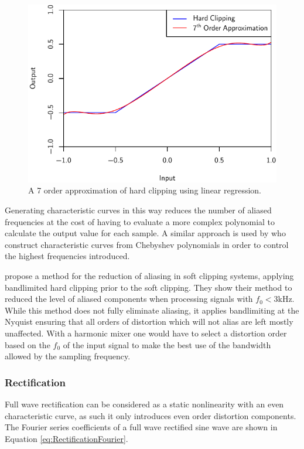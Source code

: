 			\begin{figure}[h!]
				\centering
				\includegraphics{chapter5/Images/ClippingApproximation.pdf}
				\caption{A 7 order approximation of hard clipping using linear regression.}
				\label{fig:ClippingApproximation}
			\end{figure}

			Generating characteristic curves in this way reduces the number of aliased frequencies at the cost
			of having to evaluate a more complex polynomial to calculate the output value for each sample. A
			similar approach is used by \citet{fernandez-cid2001distortion} who construct characteristic curves
			from Chebyshev polynomials in order to control the highest frequencies introduced.

			\citet{esqueda2015aliasing} propose a method for the reduction of aliasing in soft clipping
			systems, applying bandlimited hard clipping prior to the soft clipping. They show their method to
			reduced the level of aliased components when processing signals with $f_{0} < 3$kHz. While this
			method does not fully eliminate aliasing, it applies bandlimiting at the Nyquist ensuring that all
			orders of distortion which will not alias are left mostly unaffected. With a harmonic mixer one
			would have to select a distortion order based on the $f_{0}$ of the input signal to make the best
			use of the bandwidth allowed by the sampling frequency.

		\subsubsection*{Rectification}
			Full wave rectification can be considered as a static nonlinearity with an even characteristic
			curve, as such it only introduces even order distortion components. The Fourier series coefficients
			of a full wave rectified sine wave are shown in Equation \ref{eq:RectificationFourier}.

